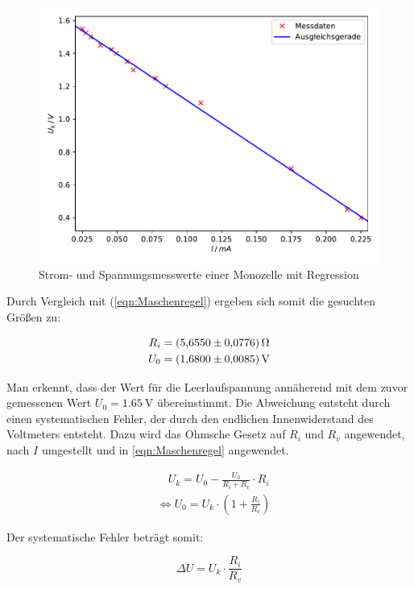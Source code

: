 \begin{figure}
  \centering
  \includegraphics[scale=0.75]{content/plot1.pdf}
  \caption{Strom- und Spannungsmesswerte einer Monozelle mit Regression}
  \label{fig:plot1}
\end{figure}

Durch Vergleich mit (\ref{eqn:Maschenregel}) ergeben sich somit 
die gesuchten Größen zu: 

\begin{align*}
R_i &= \SI{5.655+-0.0776}{\ohm}\\
U_0 &= \SI{1.680+-0.0085}{\volt}
\end{align*}

Man erkennt, dass der Wert für die Leerlaufspannung annäherend mit dem zuvor
gemessenen Wert $U_0 = \SI{1.65}{\volt}$ übereinstimmt. Die Abweichung entsteht
durch einen systematischen Fehler, der durch den endlichen Innenwiderstand des
Voltmeters entsteht.
Dazu wird das Ohmsche Gesetz auf $R_i$ und $R_v$ angewendet, nach $I$ umgestellt
und in \ref{eqn:Maschenregel} angewendet.

\begin{align*}
&\quad U_k = U_0 - \frac{U_0}{R_i+R_v}\cdot R_i\\
&\Leftrightarrow U_0 = U_k\cdot (1 + \frac{R_i}{R_v})
\end{align*}

Der systematische Fehler beträgt somit:

\begin{equation}
\Delta U = U_k\cdot \frac{R_i}{R_v}
\end{equation}

